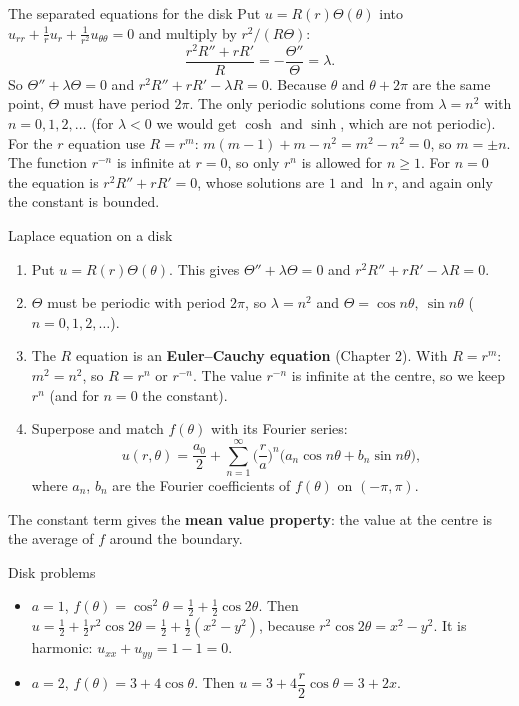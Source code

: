 \begin{derivbox}{The separated equations for the disk}
Put $u = R(r)\Theta(\theta)$ into $u_{rr} + \frac1ru_r + \frac1{r^2}u_{\theta\theta} = 0$ and multiply by $r^2/(R\Theta)$:
\[ \frac{r^2R'' + rR'}{R} = -\frac{\Theta''}{\Theta} = \lambda. \]
So $\Theta'' + \lambda\Theta = 0$ and $r^2R'' + rR' - \lambda R = 0$. Because $\theta$ and $\theta + 2\pi$ are the same point, $\Theta$ must have period $2\pi$. The only periodic solutions come from $\lambda = n^2$ with $n = 0,1,2,\dots$ (for $\lambda<0$ we would get $\cosh$ and $\sinh$, which are not periodic). For the $r$ equation use $R = r^m$: $m(m-1) + m - n^2 = m^2 - n^2 = 0$, so $m = \pm n$. The function $r^{-n}$ is infinite at $r = 0$, so only $r^n$ is allowed for $n\ge1$. For $n=0$ the equation is $r^2R''+rR'=0$, whose solutions are $1$ and $\ln r$, and again only the constant is bounded.
\end{derivbox}

\begin{methodbox}{Laplace equation on a disk}
\begin{enumerate}
  \item Put $u = R(r)\Theta(\theta)$. This gives $\Theta'' + \lambda\Theta=0$ and $r^2R'' + rR' - \lambda R = 0$.
  \item $\Theta$ must be periodic with period $2\pi$, so $\lambda = n^2$ and $\Theta = \cos n\theta,\ \sin n\theta$ ($n = 0,1,2,\dots$).
  \item The $R$ equation is an \textbf{Euler--Cauchy equation} (Chapter 2). With $R=r^m$: $m^2 = n^2$, so $R = r^{n}$ or $r^{-n}$. The value $r^{-n}$ is infinite at the centre, so we keep $r^n$ (and for $n=0$ the constant).
  \item Superpose and match $f(\theta)$ with its Fourier series:
  \[ u(r,\theta) = \frac{a_0}{2} + \sum_{n=1}^\infty\Big(\frac ra\Big)^n\big(a_n\cos n\theta + b_n\sin n\theta\big), \]
  where $a_n$, $b_n$ are the Fourier coefficients of $f(\theta)$ on $(-\pi,\pi)$.
\end{enumerate}
\end{methodbox}

The constant term gives the \textbf{mean value property}: the value at the centre is the average of $f$ around the boundary.

\begin{examplebox}{Disk problems}
\begin{itemize}
  \item $a = 1$, $f(\theta) = \cos^2\theta = \tfrac12 + \tfrac12\cos 2\theta$. Then $u = \tfrac12 + \tfrac12r^2\cos 2\theta = \tfrac12 + \tfrac12(x^2-y^2)$, because $r^2\cos2\theta = x^2-y^2$. It is harmonic: $u_{xx}+u_{yy} = 1 - 1 = 0$.
  \item $a=2$, $f(\theta) = 3 + 4\cos\theta$. Then $u = 3 + 4\dfrac r2\cos\theta = 3 + 2x$.
\end{itemize}
\end{examplebox}

